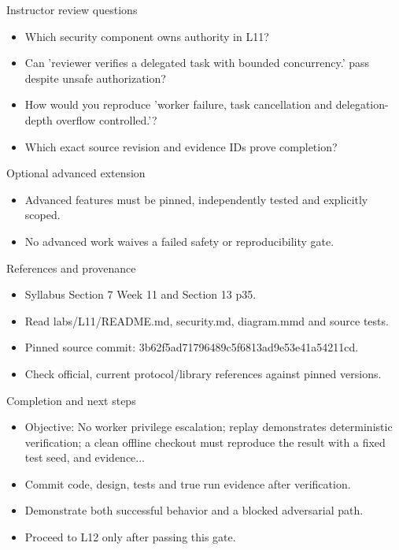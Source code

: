 \documentclass[aspectratio=169,10pt]{beamer}
\begin{document}
\begin{frame}{Instructor review questions}
\small
\begin{itemize}
\item Which security component owns authority in L11?
\item Can 'reviewer verifies a delegated task with bounded concurrency.' pass despite unsafe authorization?
\item How would you reproduce 'worker failure, task cancellation and delegation-depth overflow controlled.'?
\item Which exact source revision and evidence IDs prove completion?
\end{itemize}

\end{frame}

\begin{frame}{Optional advanced extension}
\small
\begin{itemize}
\item Advanced features must be pinned, independently tested and explicitly scoped.
\item No advanced work waives a failed safety or reproducibility gate.
\end{itemize}

\end{frame}

\begin{frame}{References and provenance}
\small
\begin{itemize}
\item Syllabus Section 7 Week 11 and Section 13 p35.
\item Read labs/L11/README.md, security.md, diagram.mmd and source tests.
\item Pinned source commit: 3b62f5ad71796489c5f6813ad9e53e41a54211cd.
\item Check official, current protocol/library references against pinned versions.
\end{itemize}

\end{frame}

\begin{frame}{Completion and next steps}
\small
\begin{itemize}
\item Objective: No worker privilege escalation; replay demonstrates deterministic verification; a clean offline checkout must reproduce the result with a fixed test seed, and evidence...
\item Commit code, design, tests and true run evidence after verification.
\item Demonstrate both successful behavior and a blocked adversarial path.
\item Proceed to L12 only after passing this gate.
\end{itemize}

\end{frame}
\end{document}
